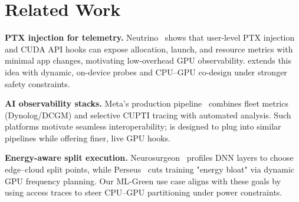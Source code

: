 \section{Related Work}\label{sec:related_work}

\textbf{PTX injection for telemetry.} Neutrino~\cite{neutrino} shows that user-level PTX injection and CUDA API hooks can expose allocation, launch, and resource metrics with minimal app changes, motivating low-overhead GPU observability. \sys extends this idea with dynamic, on-device probes and CPU–GPU co-design under stronger safety constraints.

\textbf{AI observability stacks.} Meta's production pipeline~\cite{ai-observability} combines fleet metrics (Dynolog/DCGM) and selective CUPTI tracing with automated analysis. Such platforms motivate seamless interoperability; \sys is designed to plug into similar pipelines while offering finer, live GPU hooks.

\textbf{Energy-aware split execution.} Neurosurgeon~\cite{neurosurgeon} profiles DNN layers to choose edge–cloud split points, while Perseus~\cite{chung2024reducing} cuts training "energy bloat" via dynamic GPU frequency planning. Our ML-Green use case aligns with these goals by using access traces to steer CPU–GPU partitioning under power constraints.

